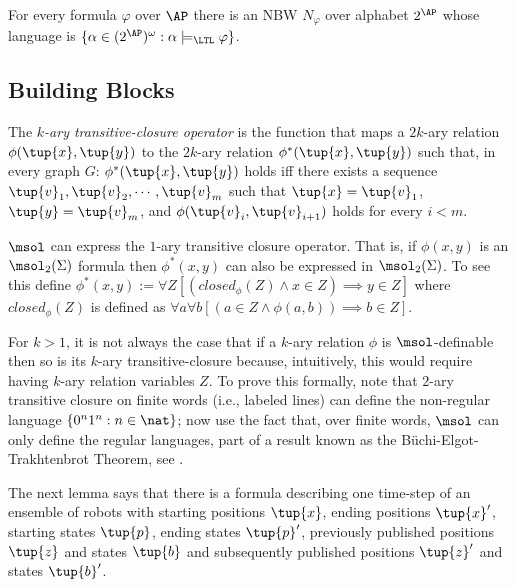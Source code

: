 \begin{theorem} \label{thm:LTL to NBW}
 For every \LTL formula $\varphi$ over $\AP$ there is an NBW $N_\varphi$ over alphabet $2^{\AP}$ whose language is 
 $\{\alpha \in (2^{\AP})^\omega : \alpha \models_\LTL \varphi\}$.
\end{theorem}

\subsection{\msol Building Blocks}


The {\em $k$-ary transitive-closure operator} is the function that maps a $2k$-ary relation $\phi(\tup{x},\tup{y})$ to the $2k$-ary relation $\phi^*(\tup{x},\tup{y})$ such that, in every graph $G$: $\phi^*(\tup{x},\tup{y})$ holds iff there exists a sequence $\tup{v}_1, \tup{v}_2, \cdots, \tup{v}_m$ such that $\tup{x} = \tup{v}_1$, $\tup{y} = \tup{v}_m$, and $\phi(\tup{v}_i,\tup{v}_{i+1})$ holds for every $i < m$. 
 
 $\msol$ can express the $1$-ary transitive closure operator. That is, if $\phi(x,y)$ is an $\msol_2(\Sigma)$ formula then $\phi^*(x,y)$ can also be expressed in $\msol_2(\Sigma)$. To see this define $\phi^*(x,y) := \forall Z [(closed_{\phi}(Z) \wedge x \in Z) \implies y \in Z]$ where $closed_{\phi}(Z)$ is defined as $\forall a \forall b[(a \in Z \wedge \phi(a,b)) \implies b \in Z]$. 
 
\begin{remark}
 
 For $k > 1$, it is not always the case that if a $k$-ary relation $\phi$ is $\msol$-definable then so is its $k$-ary transitive-closure because, intuitively, this would require having $k$-ary relation variables $Z$. To prove this formally, note that $2$-ary transitive closure on finite words (i.e., labeled lines) can define the non-regular language $\{0^n1^n : n \in \nat\}$; now use the fact that, over finite words, $\msol$ can only define the regular languages, part of a result known as the B\"uchi-Elgot-Trakhtenbrot Theorem, see \cite{Thomas96}.
\end{remark}
 

The next lemma says that there is a formula describing one time-step of an ensemble of robots with starting positions $\tup{x}$, ending positions $\tup{x}'$, starting states $\tup{p}$, ending states $\tup{p}'$, previously published positions $\tup{z}$ and states $\tup{b}$ and subsequently published positions $\tup{z}'$ and states $\tup{b}'$.

